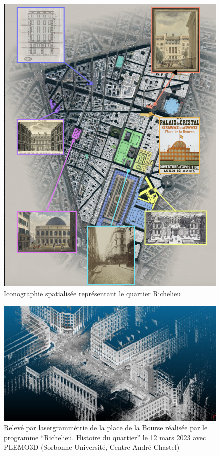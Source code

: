 \documentclass[11pt,french]{article}
\begin{document}
\clearpage
\begin{figure}[!p]
	\centering
	\includegraphics[width=\textwidth]{includes/image2.png}
	\caption{Iconographie spatialisée représentant le quartier Richelieu}
	\label{fig:spatial}
\end{figure}

\clearpage
\begin{figure}[!p]
 \centering
 \includegraphics[width=\textwidth]{includes/lasergrammetrie.jpg}
 \caption{Relevé par lasergrammétrie de la place de la Bourse réalisée par le programme \enquote{Richelieu. Histoire du quartier} le 12 mars 2023 avec PLEMO3D (Sorbonne Université, Centre André Chastel)}
 \label{fig:laser}
\end{figure}
\end{document}

